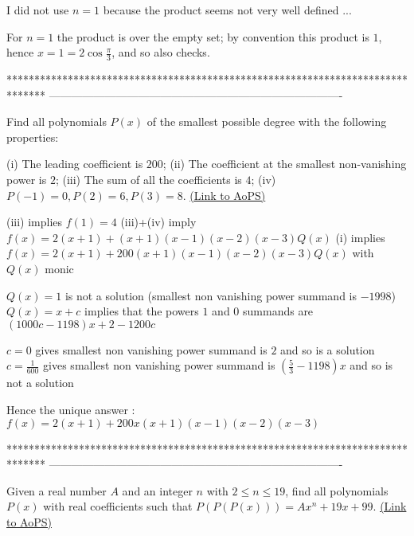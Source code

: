 \begin{solution}
	\begin{tcolorbox}I did not use $n=1$ because the product seems not very well defined ...\end{tcolorbox}
For $n=1$ the product is over the empty set; by convention this product is $1$, hence $x= 1 = 2\cos \frac {\pi} {3}$, and so also checks.
\end{solution}
*******************************************************************************
-------------------------------------------------------------------------------

\begin{problem}
	Find all polynomials $P(x)$ of the smallest possible degree with the following properties:

(i) The leading coefficient is $200$;
(ii) The coefficient at the smallest non-vanishing power is $2$;
(iii) The sum of all the coefficients is $4$;
(iv) $P(-1) = 0, P(2) = 6, P(3) = 8$.
	\flushright \href{https://artofproblemsolving.com/community/c6h414490}{(Link to AoPS)}
\end{problem}



\begin{solution}
	(iii) implies $f(1)=4$
(iii)+(iv) imply $f(x)=2(x+1)+(x+1)(x-1)(x-2)(x-3)Q(x)$
(i) implies $f(x)=2(x+1)+200(x+1)(x-1)(x-2)(x-3)Q(x)$ with $Q(x)$ monic

$Q(x)=1$ is not a solution (smallest non vanishing power summand is $-1998$)
$Q(x)=x+c$ implies that the powers $1$ and $0$ summands are $(1000c-1198)x+2-1200c$

$c=0$ gives smallest non vanishing power summand is $2$ and so is a solution
$c=\frac 1{600}$ gives smallest non vanishing power summand is $(\frac 53-1198)x$ and so is not a solution

Hence the unique answer : $\boxed{f(x)=2(x+1)+200x(x+1)(x-1)(x-2)(x-3)}$
\end{solution}
*******************************************************************************
-------------------------------------------------------------------------------

\begin{problem}
	Given a real number $A$ and an integer $n$ with $2 \leq n \leq 19$, find all polynomials $P(x)$ with real coefficients such that $P(P(P(x))) = Ax^n +19x+99$.
	\flushright \href{https://artofproblemsolving.com/community/c6h415151}{(Link to AoPS)}
\end{problem}




